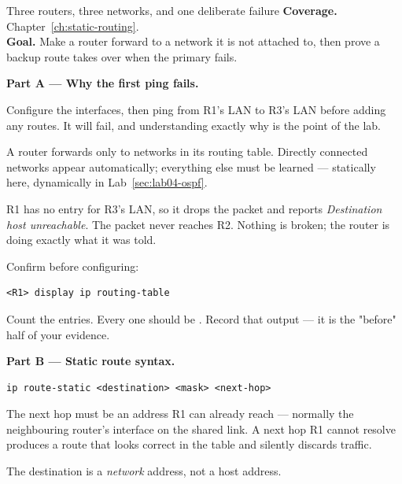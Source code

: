 
\begin{labproject}{Three routers, three networks, and one deliberate failure}
\textbf{Coverage.} Chapter~\ref{ch:static-routing}.\\
\textbf{Goal.} Make a router forward to a network it is not attached to, then prove a backup route takes over when the primary fails.

\medskip\noindent\textbf{Part A --- Why the first ping fails.}\par
Configure the interfaces, then ping from R1's LAN to R3's LAN before adding any routes. It will fail, and understanding exactly why is the point of the lab.

\begin{keyidea}
A router forwards only to networks in its routing table. Directly connected networks appear automatically; everything else must be learned --- statically here, dynamically in Lab~\ref{sec:lab04-ospf}.

R1 has no entry for R3's LAN, so it drops the packet and reports \emph{Destination host unreachable}. The packet never reaches R2. Nothing is broken; the router is doing exactly what it was told.
\end{keyidea}

Confirm before configuring:

\begin{lstlisting}[style=dcnterminal]
<R1> display ip routing-table
\end{lstlisting}

Count the entries. Every one should be . Record that output --- it is the "before" half of your evidence.

\medskip\noindent\textbf{Part B --- Static route syntax.}\par

\begin{lstlisting}[style=dcnterminal]
ip route-static <destination> <mask> <next-hop>
\end{lstlisting}

The next hop must be an address R1 can already reach --- normally the neighbouring router's interface on the shared link. A next hop R1 cannot resolve produces a route that looks correct in the table and silently discards traffic.

\begin{pitfall}
The destination is a \emph{network} address, not a host address.


\end{pitfall}
\end{labproject}
